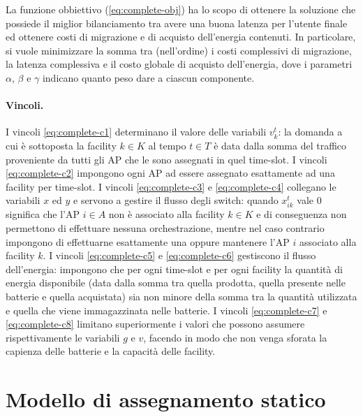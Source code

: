 La funzione obbiettivo (\ref{eq:complete-obj}) ha lo scopo di ottenere la soluzione che possiede il miglior bilanciamento tra avere una buona latenza per l'utente finale ed ottenere costi di migrazione e di acquisto dell'energia contenuti. In particolare, si vuole minimizzare la somma tra (nell'ordine) i costi complessivi di migrazione, la latenza complessiva e il costo globale di acquisto dell'energia, dove i parametri $\alpha$, $\beta$ e $\gamma$ indicano quanto peso dare a ciascun componente.

\paragraph*{Vincoli.}

I vincoli \ref{eq:complete-c1} determinano il valore delle variabili $v^t_k$: la domanda a cui è sottoposta la facility $k \in K$ al tempo $t \in T$ è data dalla somma del traffico proveniente da tutti gli AP che le sono assegnati in quel time-slot. I vincoli \ref{eq:complete-c2} impongono ogni AP ad essere assegnato esattamente ad una facility per time-slot. I vincoli \ref{eq:complete-c3} e \ref{eq:complete-c4} collegano le variabili $x$ ed $y$ e servono a gestire il flusso degli switch: quando $x^t_{ik}$ vale 0 significa che l'AP $i \in A$ non è associato alla facility $k \in K$ e di conseguenza non permettono di effettuare nessuna orchestrazione, mentre nel caso contrario impongono di effettuarne esattamente una oppure mantenere l'AP $i$ associato alla facility $k$. I vincoli \ref{eq:complete-c5} e \ref{eq:complete-c6} gestiscono il flusso dell'energia: impongono che per ogni time-slot e per ogni facility la quantità di energia disponibile (data dalla somma tra quella prodotta, quella presente nelle batterie e quella acquistata) sia non minore della somma tra la quantità utilizzata e quella che viene immagazzinata nelle batterie. I vincoli \ref{eq:complete-c7} e \ref{eq:complete-c8} limitano superiormente i valori che possono assumere rispettivamente le variabili $g$ e $v$, facendo in modo che non venga sforata la capienza delle batterie e la capacità delle facility.


%
%
\section{Modello di assegnamento statico}
\label{sec:modello-migrazioni-inf}

